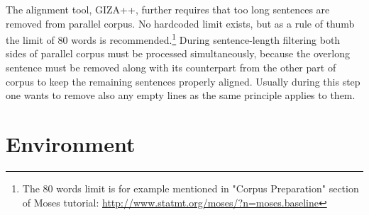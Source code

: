 The alignment tool, GIZA++, further requires that too long sentences are removed from parallel corpus.
No hardcoded limit exists, but as a rule of thumb the limit of 80 words is
recommended.\footnote{The 80 words limit is for example mentioned in "Corpus Preparation" section of Moses tutorial:
\url{http://www.statmt.org/moses/?n=moses.baseline}}
During sentence-length filtering both sides of parallel corpus must be processed simultaneously,
because the overlong sentence must be removed along with its counterpart from the other part of corpus
to keep the remaining sentences properly aligned.
Usually during this step one wants to remove also any empty lines as the same principle applies to them.

\section{Environment}
